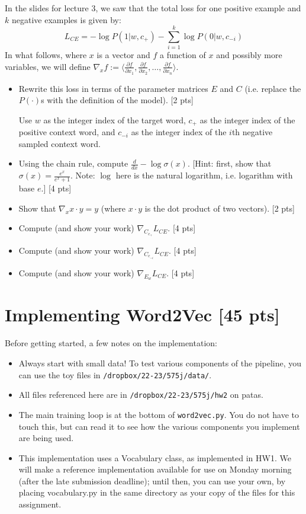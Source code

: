 \documentclass[11pt]{article}
\begin{document}
\vspace{2em}
  In the slides for lecture 3, we saw that the total loss for one positive example and $k$ negative examples is given by:
$$ L_{CE} = -\log P(1 | w, c_+) - \sum_{i=1}^k \log P(0 | w, c_{-i})$$
In what follows, where $x$ is a vector and $f$ a function of $x$ and possibly more variables, we will define $\nabla_x f := \langle \frac{\partial f}{\partial x_1} , \frac{\partial f}{\partial x_2}, \dots , \frac{\partial f}{\partial x_n} \rangle$.
\begin{itemize}
  \item Rewrite this loss in terms of the parameter matrices $E$ and $C$ (i.e. replace the $P(\cdot)$s with the definition of the model). [2 pts]

        Use $w$ as the integer index of the target word, $c_+$ as the integer index of the positive context word, and $c_{-i}$ as the integer index of the $i$th negative sampled context word.
  \item Using the chain rule, compute $\frac{d}{dx} -\log\sigma(x)$.  [Hint: first, show that $\sigma(x) = \frac{e^x}{e^x+1}$.  Note: $\log$ here is the natural logarithm, i.e. logarithm with base $e$.] [4 pts]
  \item Show that $\nabla_x x \cdot y = y$ (where $x \cdot y$ is the dot product of two vectors). [2 pts]
  \item Compute (and show your work) $\nabla_{C_{c_+}} L_{CE}$. [4 pts]
  \item Compute (and show your work) $\nabla_{C_{c_{-i}}} L_{CE}$. [4 pts]
  \item Compute (and show your work) $\nabla_{E_w} L_{CE}$. [4 pts]
\end{itemize}


\section{Implementing Word2Vec [45 pts]}

Before getting started, a few notes on the implementation:
\begin{itemize}
  \item Always start with small data!  To test various components of the pipeline, you can use the toy files in \texttt{/dropbox/22-23/575j/data/}.
  \item All files referenced here are in \texttt{/dropbox/22-23/575j/hw2} on patas.
  \item The main training loop is at the bottom of \texttt{word2vec.py}.  You do not have to touch this, but can read it to see how the various components you implement are being used.
  \item This implementation uses a Vocabulary class, as implemented in HW1.  We will make a reference implementation available for use on Monday morning (after the late submission deadline); until then, you can use your own, by placing vocabulary.py in the same directory as your copy of the files for this assignment.
\end{itemize}
\end{document}
